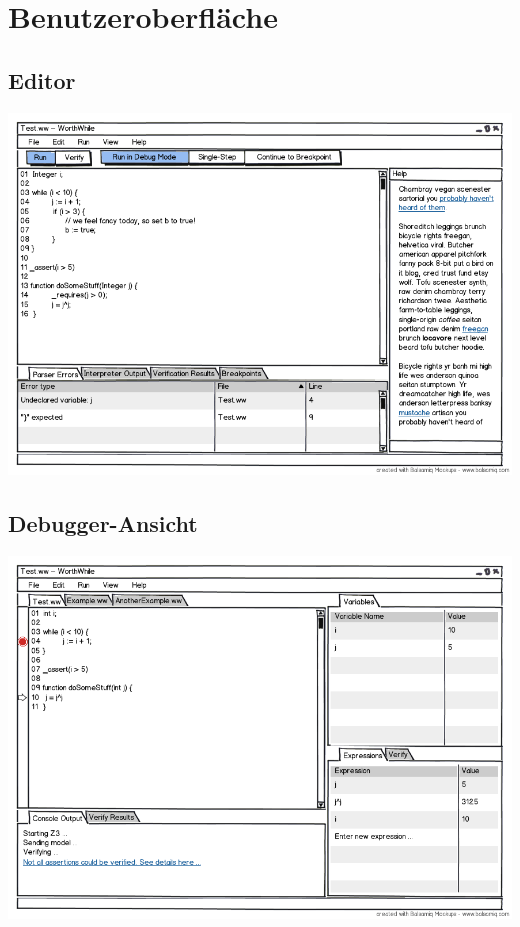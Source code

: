 \section{Benutzeroberfläche}%

\subsection{Editor}%

\includegraphics[width=\textwidth]{mockup/editor.png}

\subsection{Debugger-Ansicht}%

\includegraphics[width=\textwidth]{mockup/debug.png}
